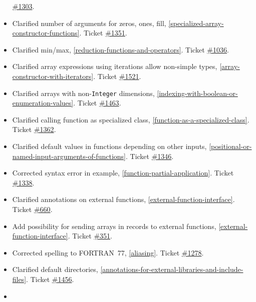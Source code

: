 \begin{itemize}
  \href{https://github.com/modelica/ModelicaSpecification/issues/1303}{\#1303}.
\item
  Clarified number of arguments for zeros, ones, fill, \cref{specialized-array-constructor-functions}.
  Ticket \href{https://github.com/modelica/ModelicaSpecification/issues/1351}{\#1351}.
\item
  Clarified min/max, \cref{reduction-functions-and-operators}. Ticket
  \href{https://github.com/modelica/ModelicaSpecification/issues/1036}{\#1036}.
\item
  Clarified array expressions using iterations allow non-simple types,
  \cref{array-constructor-with-iterators}. Ticket
  \href{https://github.com/modelica/ModelicaSpecification/issues/1521}{\#1521}.
\item
  Clarified arrays with non-\lstinline!Integer! dimensions, \cref{indexing-with-boolean-or-enumeration-values}.
  Ticket \href{https://github.com/modelica/ModelicaSpecification/issues/1463}{\#1463}.
\item
  Clarified calling function as specialized class, \cref{function-as-a-specialized-class}. Ticket
  \href{https://github.com/modelica/ModelicaSpecification/issues/1362}{\#1362}.
\item
  Clarified default values in functions depending on other inputs,
  \cref{positional-or-named-input-arguments-of-functions}. Ticket
  \href{https://github.com/modelica/ModelicaSpecification/issues/1346}{\#1346}.
\item
  Corrected syntax error in example, \cref{function-partial-application}. Ticket
  \href{https://github.com/modelica/ModelicaSpecification/issues/1338}{\#1338}.
\item
  Clarified annotations on external functions, \cref{external-function-interface}. Ticket
  \href{https://github.com/modelica/ModelicaSpecification/issues/660}{\#660}.
\item
  Add possibility for sending arrays in records to external functions,
  \cref{external-function-interface}. Ticket
  \href{https://github.com/modelica/ModelicaSpecification/issues/351}{\#351}.
\item
  Corrected spelling to FORTRAN~77, \cref{aliasing}. Ticket
  \href{https://github.com/modelica/ModelicaSpecification/issues/1278}{\#1278}.
\item
  Clarified default directories, \cref{annotations-for-external-libraries-and-include-files}. Ticket
  \href{https://github.com/modelica/ModelicaSpecification/issues/1456}{\#1456}.
\item

\end{itemize}
